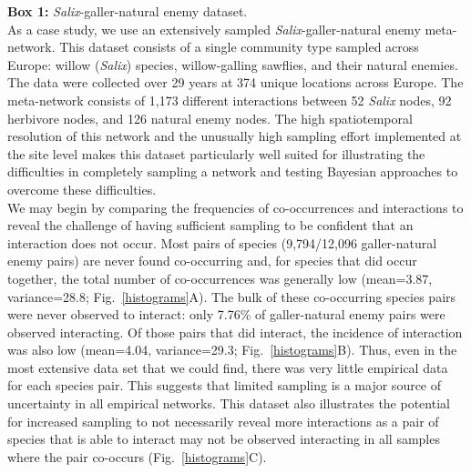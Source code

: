 \documentclass[12pt]{article}
\begin{document}
\begin{fullbox}{}
  \begin{spacing}{1.0}
    \textbf{Box 1: }\emph{Salix}-galler-natural enemy dataset.\\
    \indent As a case study, we use an extensively sampled \emph{Salix}-galler-natural enemy meta-network. This dataset consists of a single community type sampled across Europe: willow (\emph{Salix}) species, willow-galling sawflies, and their natural enemies. The data were collected over 29 years at 374 unique locations across Europe. The meta-network consists of 1,173 different interactions between 52 \emph{Salix} nodes, 92 herbivore nodes, and 126 natural enemy nodes. The high spatiotemporal resolution of this network and the unusually high sampling effort implemented at the site level makes this dataset particularly well suited for illustrating the difficulties in completely sampling a network and testing Bayesian approaches to overcome these difficulties.\\
    \indent We may begin by comparing the frequencies of co-occurrences and interactions to reveal the challenge of having sufficient sampling to be confident that an interaction does not occur. Most pairs of species (9,794/12,096 galler-natural enemy pairs) are never found co-occurring and, for species that did occur together, the total number of co-occurrences was generally low (mean=3.87, variance=28.8; Fig.~\ref{histograms}A). The bulk of these co-occurring species pairs were never observed to interact: only 7.76\% of galler-natural enemy pairs were observed interacting. Of those pairs that did interact, the incidence of interaction was also low (mean=4.04, variance=29.3; Fig.~\ref{histograms}B). Thus, even in the most extensive data set that we could find, there was very little empirical data for each species pair. This suggests that limited sampling is a major source of uncertainty in all empirical networks. This dataset also illustrates the potential for increased sampling to not necessarily reveal more interactions as a pair of species that is able to interact may not be observed interacting in all samples where the pair co-occurs (Fig.~\ref{histograms}C).
  \end{spacing}
\end{fullbox}

\clearpage
\end{document}
